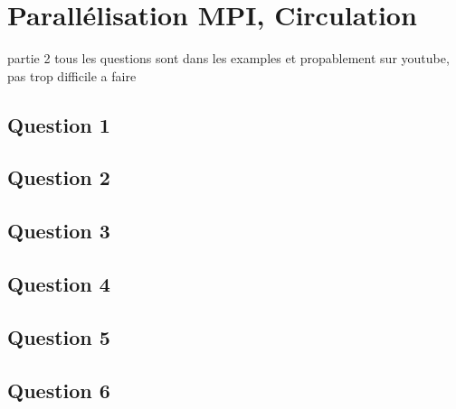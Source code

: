 \documentclass{article}
\begin{document}
\section{Parallélisation MPI, Circulation}

partie 2
tous les questions sont dans les examples et propablement sur youtube, pas trop difficile a faire


\subsection*{Question 1}
\begin{resolution}
    
\end{resolution}

\newpage\subsection*{Question 2}
\begin{resolution}
    
\end{resolution}

\newpage\subsection*{Question 3}
\begin{resolution}
    
\end{resolution}

\newpage\subsection*{Question 4}
\begin{resolution}
    
\end{resolution}

\newpage\subsection*{Question 5}
\begin{resolution}
    
\end{resolution}

\newpage\subsection*{Question 6}
\begin{resolution}
    
\end{resolution}
\end{document}
